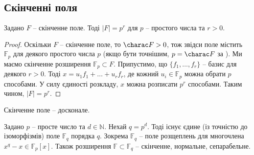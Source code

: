 \documentclass{math_library}
\begin{document}
\subsection{Скінченні поля}
\begin{proposition}
Задано $F$ -- скінченне поле. Тоді $|F| = p^r$ для $p$ -- простого числа та $r > 0$.
\end{proposition}

\begin{proof}
Оскільки $F$ -- скінченне поле, то $\charac F > 0$, тож звідси поле містить $\mathbb{F}_p$ для деякого простого числа $p$ (якщо бути точнішим, $p = \charac F$ за ). Ми маємо скінченне розширення $\mathbb{F}_p \subset F$. Припустимо, що $\{f_1,\dots,f_r\}$ -- базис для деякого $r > 0$. Тоді $x = u_1 f_1 + \dots + u_r f_r$, де кожний $u_i \in \mathbb{F}_p$ можна обрати $p$ способами. У силу єдиності розкладу, $x$ можна розписати $p^r$ способами. Таким чином, $|F| = p^r$.
\end{proof}

\begin{corollary}
Скінченне поле -- досконале.
\end{corollary}

\begin{theorem}
Задано $p$ -- просте число та $d \in \mathbb{N}$. Нехай $q = p^d$. Тоді існує єдине (із точністю до ізоморфізмів) поле $\mathbb{F}_q$ порядка $q$. Зокрема $\mathbb{F}_q$ -- поле розщеплень для многочлена $x^q - x \in \mathbb{F}_p[x]$. Також розширення $\mathbb{F} \subset \mathbb{F}_q$ -- скінченне, нормальне, сепарабельне.
\end{theorem}
\end{document}
